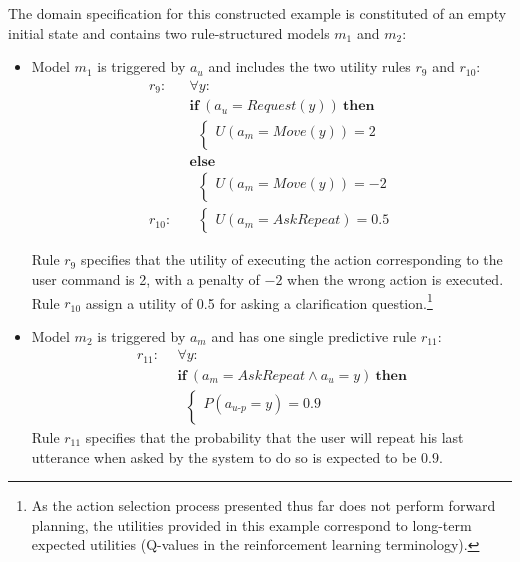 The domain specification for this constructed example is constituted of an empty initial state and contains two rule-structured models $m_1$ and $m_2$: \begin{itemize}
\item Model $m_1$ is triggered by $a_u$ and includes the two utility rules $r_{9}$ and $r_{10}$:
\begin{align*}
r_{9}: \ \ & \forall y: \\ 
& \textbf{if} \ (a_u = Request(y)) \ \textbf{then} \\ 
& \; \; \begin{cases} 
U(a_m = Move(y)) = 2 \\ 
\end{cases} \\
& \textbf{else} \\ 
& \; \; \begin{cases} 
U(a_m = Move(y)) = -2 \\ 
\end{cases} \\[4mm]
r_{10}: \ \ &  \; \; \begin{cases} U(a_m = \mathit{AskRepeat}) = 0.5 \end{cases}
\end{align*}

Rule $r_{9}$ specifies that the utility of executing the action corresponding to the user command is 2, with a penalty of $-2$ when the wrong action is executed. Rule $r_{10}$ assign a utility of 0.5 for asking a clarification question.\footnote{As the action selection process presented thus far does not perform forward planning, the utilities provided in this example correspond to long-term expected utilities (Q-values in the reinforcement learning terminology).}

\item Model $m_2$ is triggered by $a_m$ and has one single predictive rule $r_{11}$: 
\begin{align*}
r_{11}: \ \ & \forall y: \\ 
& \textbf{if} \ (a_m = \mathit{AskRepeat} \land a_u=y) \ \textbf{then} \\ 
& \; \;  \begin{cases} 
P(a_{u\mbox{-}p} = y) = 0.9 \\ 
\end{cases}
\end{align*}
Rule $r_{11}$ specifies that the probability that the user will repeat his last utterance when asked by the system to do so is expected to be $0.9$.
\end{itemize}


